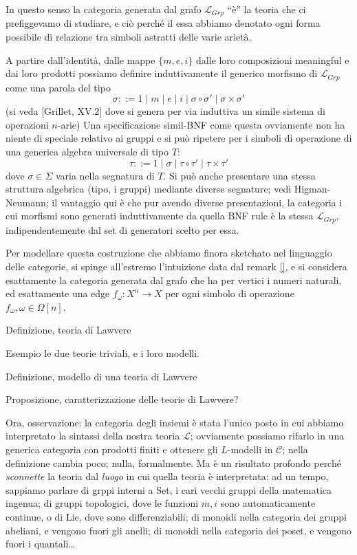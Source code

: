 \documentclass[a4paper, 11pt]{article}
\begin{document}
In questo senso la categoria generata dal grafo $\mathcal{L}_{Grp}$ ``è'' la teoria che ci prefiggevamo di studiare, e ciò perché il essa abbiamo denotato ogni forma possibile di relazione tra simboli astratti delle varie arietà.

A partire dall'identità, dalle mappe $\{m,e,i\}$ dalle loro composizioni meaningful e dai loro prodotti possiamo definire induttivamente il generico morfismo di $\mathcal{L}_{Grp}$ come una parola del tipo
\[\sigma ::= 1 \mid m \mid e \mid i \mid \sigma \circ \sigma' \mid \sigma\times \sigma'\]
(si veda [Grillet, XV.2] dove si genera per via induttiva un simile sistema di operazioni $n$-arie) Una specificazione simil-BNF come questa ovviamente non ha niente di speciale relativo ai gruppi e si può ripetere per i simboli di operazione di una generica algebra universale di tipo $T$:
\[\tau ::= 1 \mid \sigma \mid \tau \circ \tau' \mid \tau\times \tau'\]
dove $\sigma\in\Sigma$ varia nella segnatura di $T$. Si può anche presentare una stessa struttura algebrica (tipo, i gruppi) mediante diverse segnature; vedi Higman-Neumann; il vantaggio qui è che pur avendo diverse presentazioni, la categoria i cui morfismi sono generati induttivamente da quella BNF rule è la stessa $\mathcal{L}_{Grp}$, indipendentemente dal set di generatori scelto per essa.

Per modellare questa costruzione che abbiamo finora sketchato nel linguaggio delle categorie, si spinge all'estremo l'intuizione data dal remark \ref{}, e si considera esattamente la categoria generata dal grafo che ha per vertici i numeri naturali, ed esattamente una edge $f_\omega : X^n \to X$ per ogni simbolo di operazione $f_\omega, \omega \in\Omega[n]$.

Definizione, teoria di Lawvere

Esempio le due teorie triviali, e i loro modelli.

Definizione, modello di una teoria di Lawvere 

Proposizione, caratterizzazione delle teorie di Lawvere? 

Ora, osservazione: la categoria degli insiemi è stata l'unico posto in cui abbiamo interpretato la sintassi della nostra teoria $\mathcal L$; ovviamente possiamo rifarlo in una generica categoria con prodotti finiti e ottenere gli $L$-modelli in $\mathcal C$; nella definizione cambia poco; nulla, formalmente. Ma è un risultato profondo perché \emph{sconnette} la teoria dal \emph{luogo} in cui quella teoria è interpretata: ad un tempo, sappiamo parlare di grppi interni a Set, i cari vecchi gruppi della matematica ingenua; di gruppi topologici, dove le funzioni $m,i$ sono automaticamente continue, o di Lie, dove sono differenziabili; di monoidi nella categoria dei gruppi abeliani, e vengono fuori gli anelli;  di monoidi nella categoria dei poset, e vengono fuori i quantali\dots 
\end{document}
